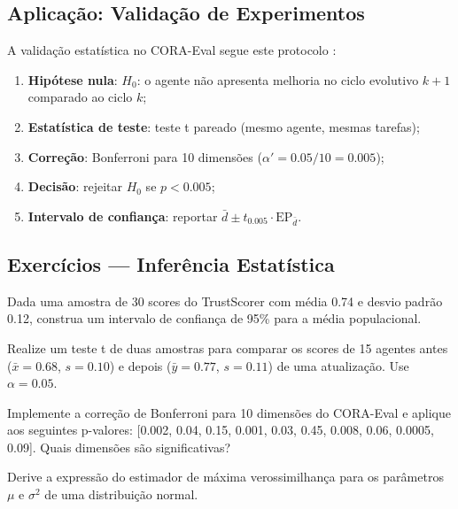 \subsection{Aplicação: Validação de Experimentos}
A validação estatística no CORA-Eval segue este protocolo
\cite{laranjeira2026cora, laranjeira2026opencode}:
\begin{enumerate}
\item \textbf{Hipótese nula}: $H_0$: o agente não apresenta melhoria no
ciclo evolutivo $k+1$ comparado ao ciclo $k$;
\item \textbf{Estatística de teste}: teste t pareado (mesmo agente,
mesmas tarefas);
\item \textbf{Correção}: Bonferroni para 10 dimensões
($\alpha' = 0.05 / 10 = 0.005$);
\item \textbf{Decisão}: rejeitar $H_0$ se $p < 0.005$;
\item \textbf{Intervalo de confiança}: reportar $\bar{d} \pm t_{0.005}
\cdot \text{EP}_{\bar{d}}$.
\end{enumerate}
\subsection{Exercícios — Inferência Estatística}
\begin{exercicio}
Dada uma amostra de 30 scores do TrustScorer com média 0.74 e desvio
padrão 0.12, construa um intervalo de confiança de 95\% para a média
populacional.
\end{exercicio}
\begin{exercicio}
Realize um teste t de duas amostras para comparar os scores de 15
agentes antes ($\bar{x} = 0.68$, $s = 0.10$) e depois ($\bar{y} = 0.77$,
$s = 0.11$) de uma atualização. Use $\alpha = 0.05$.
\end{exercicio}
\begin{exercicio}
Implemente a correção de Bonferroni para 10 dimensões do CORA-Eval e
aplique aos seguintes p-valores: [0.002, 0.04, 0.15, 0.001, 0.03, 0.45,
0.008, 0.06, 0.0005, 0.09]. Quais dimensões são significativas?
\end{exercicio}
\begin{exercicio}
Derive a expressão do estimador de máxima verossimilhança para os
parâmetros $\mu$ e $\sigma^2$ de uma distribuição normal.
\end{exercicio}
